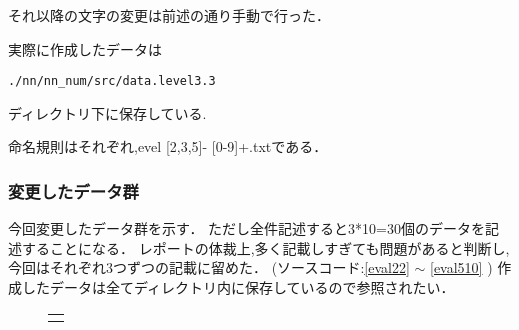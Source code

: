それ以降の文字の変更は前述の通り手動で行った．

実際に作成したデータは
\begin{oframed}
\begin{verbatim}
./nn/nn_num/src/data.level3.3
\end{verbatim}
\end{oframed}
ディレクトリ下に保存している.

命名規則はそれぞれ,evel [2,3,5]- [0-9]+.txtである．

\subsubsection{変更したデータ群}
今回変更したデータ群を示す．
ただし全件記述すると3*10=30個のデータを記述することになる．
レポートの体裁上,多く記載しすぎても問題があると判断し,今回はそれぞれ3つずつの記載に留めた． (ソースコード:\ref{eval22} $\sim$ \ref{eval510} )
作成したデータは全てディレクトリ内に保存しているので参照されたい．

\begin{figure}[H]
    \begin{center}
        \begin{tabular}{c}

            \begin{minipage}{0.33\hsize}
                \begin{center}
                
                \end{center}
                \end{minipage}

                \begin{minipage}{0.33\hsize}
                    \begin{center}
                        
                    \end{center}
                    \end{minipage}
                \begin{minipage}{0.33\hsize}
                    \begin{center}
                        
                    \end{center}
                    \end{minipage}
        \end{tabular}
\end{center}
\end{figure}

